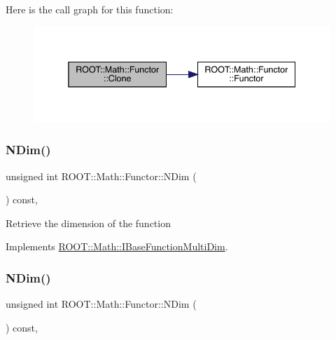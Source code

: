 Here is the call graph for this function\+:
\nopagebreak
\begin{figure}[H]
\begin{center}
\leavevmode
\includegraphics[width=338pt]{da/d8e/classROOT_1_1Math_1_1Functor_a989f9b6dd160ebe03911cdee00dacaad_cgraph}
\end{center}
\end{figure}
\mbox{\label{classROOT_1_1Math_1_1Functor_a2544e2ed3c6a0420084c7b08eb3c3130}} 
\subsubsection{\texorpdfstring{NDim()}{NDim()}\hspace{0.1cm}{\footnotesize\ttfamily [1/3]}}
{\footnotesize\ttfamily unsigned int R\+O\+O\+T\+::\+Math\+::\+Functor\+::\+N\+Dim (\begin{DoxyParamCaption}{ }\end{DoxyParamCaption}) const\hspace{0.3cm}{\ttfamily [inline]}, {\ttfamily [virtual]}}

Retrieve the dimension of the function 

Implements \mbox{\hyperlink{classROOT_1_1Math_1_1IBaseFunctionMultiDim_a16f37dc7a6d00c75ddeda0697741315d}{R\+O\+O\+T\+::\+Math\+::\+I\+Base\+Function\+Multi\+Dim}}.

\mbox{\label{classROOT_1_1Math_1_1Functor_a2544e2ed3c6a0420084c7b08eb3c3130}} 
\subsubsection{\texorpdfstring{NDim()}{NDim()}\hspace{0.1cm}{\footnotesize\ttfamily [2/3]}}
{\footnotesize\ttfamily unsigned int R\+O\+O\+T\+::\+Math\+::\+Functor\+::\+N\+Dim (\begin{DoxyParamCaption}{ }\end{DoxyParamCaption}) const\hspace{0.3cm}{\ttfamily [inline]}, {\ttfamily [virtual]}}

